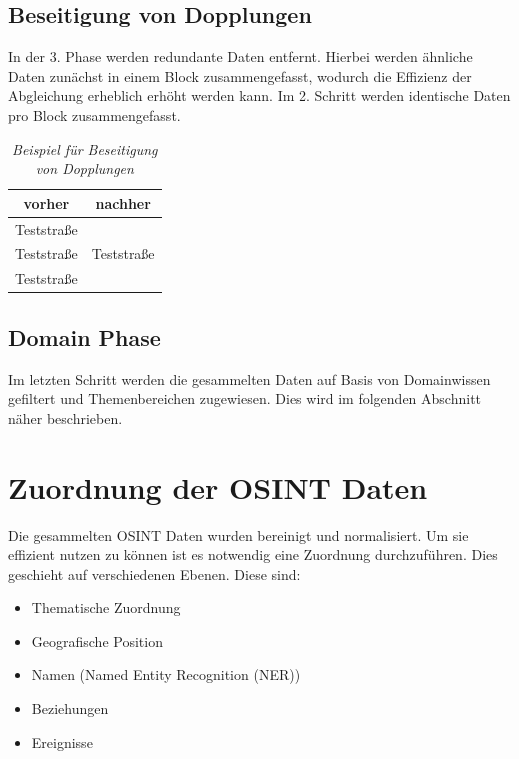 \documentclass[twoside,a4paper]{article}
\begin{document}
\subsection{Beseitigung von Dopplungen}
\label{sub:Dopplungen}
In der 3. Phase werden redundante Daten entfernt. Hierbei werden ähnliche Daten zunächst in einem Block zusammengefasst, wodurch die Effizienz der Abgleichung erheblich erhöht werden kann. Im 2. Schritt werden identische Daten pro Block zusammengefasst.
\begin{table}[htdp]
  \caption{\it Beispiel für Beseitigung von Dopplungen}
  \begin{center}
    \begin{tabular}{|c|c|}\hline
      \textbf{vorher} 	& \textbf{nachher} \\\hline
      Teststraße & \multirow{3}{*}{Teststraße}\\
      Teststraße & \\
      Teststraße & \\	  
     \hline
    \end{tabular}
  \end{center}
\end{table}

\subsection{Domain Phase}
Im letzten Schritt werden die gesammelten Daten auf Basis von Domainwissen gefiltert und Themenbereichen zugewiesen. Dies wird im folgenden Abschnitt näher beschrieben.


\section{Zuordnung der OSINT Daten}
Die gesammelten OSINT Daten wurden bereinigt und normalisiert. Um sie effizient nutzen zu können ist es notwendig eine Zuordnung durchzuführen. Dies geschieht auf verschiedenen Ebenen. Diese sind:
\begin{itemize}
  \item Thematische Zuordnung
  \item Geografische Position
  \item Namen (Named Entity Recognition (NER))
  \item Beziehungen
  \item Ereignisse
\end{itemize}
\end{document}
